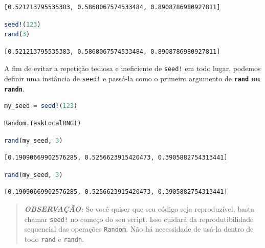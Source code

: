 \documentclass[
  notoc %
]{tufte-book}
\newcommand{\passthrough}[1]{#1}
\begin{document}
\begin{lstlisting}[language=Output]
[0.521213795535383, 0.5868067574533484, 0.8908786980927811]
\end{lstlisting}

\begin{lstlisting}[language=Julia]
seed!(123)
rand(3)
\end{lstlisting}

\begin{lstlisting}[language=Output]
[0.521213795535383, 0.5868067574533484, 0.8908786980927811]
\end{lstlisting}

A fim de evitar a repetição tediosa e ineficiente de
\passthrough{\lstinline"seed!"} em todo lugar, podemos definir uma
instância de \passthrough{\lstinline"seed!"} e passá-la como o primeiro
argumento de \textbf{\passthrough{\lstinline!rand!} ou
\passthrough{\lstinline!randn!}}.

\begin{lstlisting}[language=Julia]
my_seed = seed!(123)
\end{lstlisting}

\begin{lstlisting}[language=Output]
Random.TaskLocalRNG()
\end{lstlisting}

\begin{lstlisting}[language=Julia]
rand(my_seed, 3)
\end{lstlisting}

\begin{lstlisting}[language=Output]
[0.19090669902576285, 0.5256623915420473, 0.3905882754313441]
\end{lstlisting}

\begin{lstlisting}[language=Julia]
rand(my_seed, 3)
\end{lstlisting}

\begin{lstlisting}[language=Output]
[0.19090669902576285, 0.5256623915420473, 0.3905882754313441]
\end{lstlisting}

\begin{quote}
\textbf{\emph{OBSERVAÇÃO:}} Se você quiser que seu código seja
reproduzível, basta chamar \passthrough{\lstinline"seed!"} no começo do
seu script. Isso cuidará da reprodutibilidade sequencial das operações
\passthrough{\lstinline!Random!}. Não há necessidade de usá-la dentro de
todo \passthrough{\lstinline!rand!} e \passthrough{\lstinline!randn!}.
\end{quote}
\end{document}
